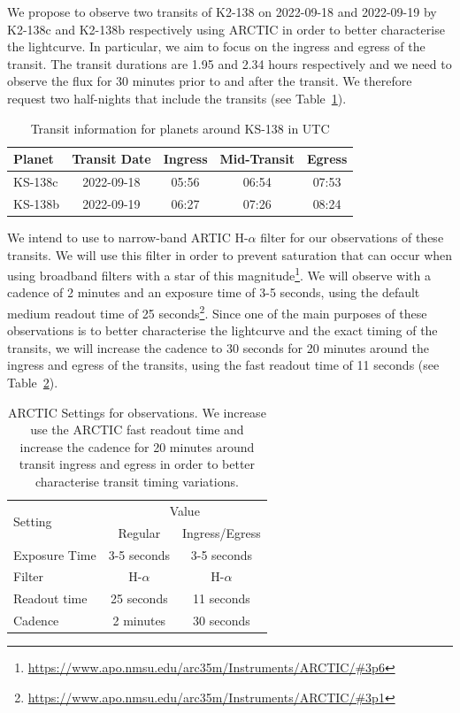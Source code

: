 \documentclass[twocolumn]{aastex631}
\begin{document}
We propose to observe two transits of K2-138 on 2022-09-18 and 2022-09-19 by K2-138c and K2-138b respectively using ARCTIC in order to better characterise the lightcurve. In particular, we aim to focus on the ingress and egress of the transit. The transit durations are 1.95 and 2.34 hours respectively and we need to observe the flux for 30 minutes prior to and after the transit. We therefore request two half-nights that include the transits (see Table~\ref{tab:transits}).

\begin{table}[htb]
    \centering
    \begin{tabular}{l|c|c|c|c} 
        \hline
        Planet & Transit Date & Ingress & Mid-Transit & Egress \\
        \hline\hline
        KS-138c & 2022-09-18 & 05:56 & 06:54 & 07:53 \\
        KS-138b & 2022-09-19 & 06:27 & 07:26 & 08:24 \\
        \hline
    \end{tabular}
    \caption{Transit information for planets around KS-138 in UTC}
    \label{tab:transits}
\end{table}

We intend to use to narrow-band ARTIC H-$\alpha$ filter for our observations of these transits. We will use this filter in order to prevent saturation that can occur when using broadband filters with a star of this magnitude\footnote{\url{https://www.apo.nmsu.edu/arc35m/Instruments/ARCTIC/\#3p6}}. We will observe with a cadence of 2 minutes and an exposure time of 3-5 seconds, using the default medium readout time of 25 seconds\footnote{\url{https://www.apo.nmsu.edu/arc35m/Instruments/ARCTIC/\#3p1}}. Since one of the main purposes of these observations is to better characterise the lightcurve and the exact timing of the transits, we will increase the cadence to 30 seconds for 20 minutes around the ingress and egress of the transits, using the fast readout time of 11 seconds (see Table~\ref{tab:settings}).

\begin{table}[htb]
    \centering
    \begin{tabular}{l|c|c} 
        \hline
        \multicolumn{1}{l|}{\multirow{2}{*}{Setting}} & \multicolumn{2}{c}{Value}                                         \\ \cline{2-3} 
\multicolumn{1}{l|}{}                         & \multicolumn{1}{c|}{Regular} & \multicolumn{1}{c}{Ingress/Egress} \\
        \hline\hline
        Exposure Time & 3-5 seconds & 3-5 seconds\\
        Filter & H-$\alpha$ & H-$\alpha$ \\
        Readout time & 25 seconds & 11 seconds \\
        Cadence & 2 minutes & 30 seconds \\
        \hline
    \end{tabular}
    \caption{ARCTIC Settings for observations. We increase use the ARCTIC fast readout time and increase the cadence for 20 minutes around transit ingress and egress in order to better characterise transit timing variations.}
    \label{tab:settings}
\end{table}


{}
\end{document}
